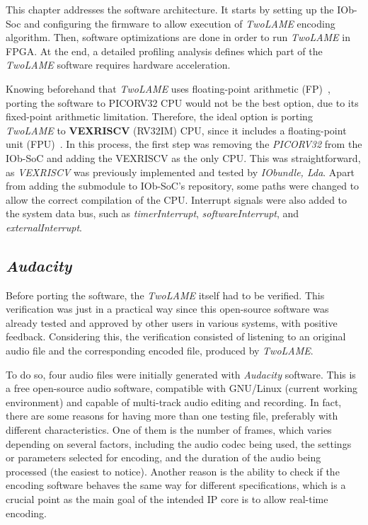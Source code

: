This chapter addresses the software architecture.
It starts by setting up the IOb-Soc and configuring the firmware to allow execution of \textit{TwoLAME} encoding algorithm. Then, software optimizations are done in order to run \textit{TwoLAME} in FPGA. 
At the end, a detailed profiling analysis defines which part of the \textit{TwoLAME} software requires hardware acceleration.

Knowing beforehand that \textit{TwoLAME} uses floating-point arithmetic (FP)~\cite{floatingpoint}, porting the software to PICORV32 CPU would not be the best option, due to its fixed-point arithmetic limitation. Therefore, the ideal option is porting \textit{TwoLAME} to \textbf{VEXRISCV} (RV32IM) CPU, since it includes a floating-point unit (FPU)~\cite{fpu}.
In this process, the first step was removing the \textit{PICORV32} from the IOb-SoC and adding the VEXRISCV as the only CPU. This was straightforward, as \textit{VEXRISCV} was previously implemented and tested by \textit{IObundle, Lda}. Apart from adding the submodule to IOb-SoC's repository, some paths were changed to allow the correct compilation of the CPU. Interrupt signals were also added to the system data bus, such as \textit{timerInterrupt}, \textit{softwareInterrupt}, and \textit{externalInterrupt}.

\subsection{\textit{Audacity}}

Before porting the software, the \textit{TwoLAME} itself had to be verified. This verification was just in a practical way since this open-source software was already tested and approved by other users in various systems, with positive feedback. Considering this, the verification consisted of listening to an original audio file and the corresponding encoded file, produced by \textit{TwoLAME}.

To do so, four audio files were initially generated with \textit{Audacity} software. This is a free open-source audio software, compatible with GNU/Linux (current working environment) and capable of multi-track audio editing and recording.
In fact, there are some reasons for having more than one testing file, preferably with different characteristics. One of them is the number of frames, which varies depending on several factors, including the audio codec being used, the settings or parameters selected for encoding, and the duration of the audio being processed (the easiest to notice). Another reason is the ability to check if the encoding software behaves the same way for different specifications, which is a crucial point as the main goal of the intended IP core is to allow real-time encoding.

